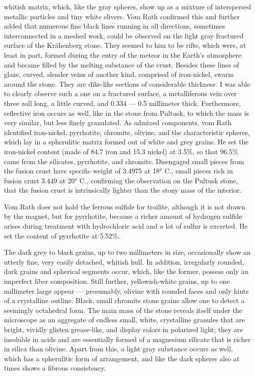 \documentclass[a4paper, 12pt, oneside]{article}
\begin{document}
whitish matrix, which, like the gray spheres, show up as a mixture of interspersed metallic particles and tiny white slivers. Vom Rath confirmed this and further added that numerous fine black lines running in all directions, sometimes interconnected in a meshed work, could be observed on the light gray fractured surface of the Krähenberg stone. They seemed to him to be rifts, which were, at least in part, formed during the entry of the meteor in the Earth's atmosphere and became filled by the melting substance of the crust. Besides these lines of glaze, curved, slender veins of another kind, comprised of iron-nickel, swarm around the stone. They are dike-like sections of considerable thickness. I was able to clearly observe such a one on a fractured surface, a metalliferous vein over three zoll long, a little curved, and 0.334 --- 0.5 millimeter thick. Furthermore, reflective iron occurs as well, like in the stone from Pultusk, to which the mass is very similar, but less finely granulated. As admixed components, vom Rath identified iron-nickel, pyrrhotite, chromite, olivine, and the characteristic spheres, which lay in a spherulitic matrix formed out of white and grey grains. He set the iron-nickel content (made of 84.7 iron and 15.3 nickel) at 3.5\%, so that 96.5\% came from the silicates, pyrrhotite, and chromite. Disengaged small pieces from the fusion crust have specific weight of 3.4975 at 18° C., small pieces rich in fusion crust 3.449 at 20° C., confirming the observation on the Pultusk stone, that the fusion crust is intrinsically lighter than the stony mass of the interior.

Vom Rath does not hold the ferrous sulfide for troilite, although it is not drawn by the magnet, but for pyrrhotite, because a richer amount of hydrogen sulfide arises during treatment with hydrochloric acid and a lot of sulfur is excreted. He set the content of pyrrhotite at 5.52\%.

The dark grey to black grains, up to two millimeters in size, occasionally show an utterly fine, very easily detached, whitish hull. In addition, irregularly rounded, dark grains and spherical segments occur, which, like the former, possess only an imperfect fiber composition. Still further, yellowish-white grains, up to one millimeter large appear --- presumably, olivine with rounded faces and only hints of a crystalline outline. Black, small chromite stone grains allow one to detect a seemingly octahedral form. The main mass of the stone reveals itself under the microscope as an aggregate of endless small, white, crystalline granules that are bright, vividly glisten grease-like, and display colors in polarized light; they are insoluble in acids and are essentially formed of a magnesium silicate that is richer in silica than olivine. Apart from this, a light gray substance occurs as well, which has a spherulitic form of arrangement, and like the dark spheres also at times shows a fibrous consistency.
\end{document}
